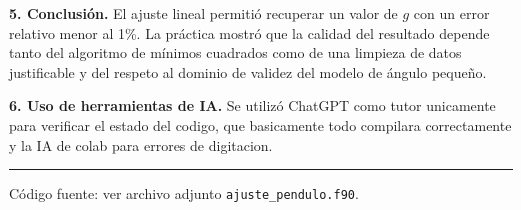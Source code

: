 \documentclass[11pt]{article}
\begin{document}
\textbf{5. Conclusión.}
El ajuste lineal permitió recuperar un valor de $g$ con un error relativo menor al 1\%. La práctica mostró que la calidad del resultado depende tanto del algoritmo de mínimos cuadrados como de una limpieza de datos justificable y del respeto al dominio de validez del modelo de ángulo pequeño.

\textbf{6. Uso de herramientas de IA.}
Se utilizó ChatGPT como tutor unicamente para verificar el estado del codigo, que basicamente todo compilara correctamente y la IA de colab para errores de digitacion.
\vspace{4pt}
\hrule
\vspace{4pt}
{\small Código fuente: ver archivo adjunto \texttt{ajuste\_pendulo.f90}.}
\end{document}
